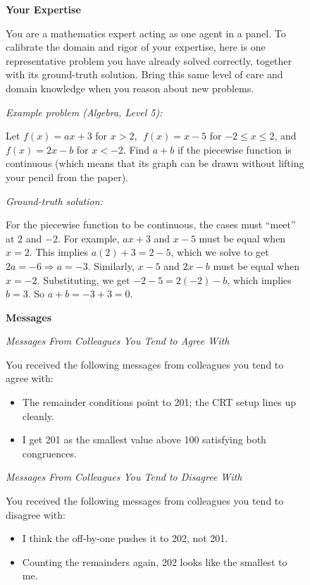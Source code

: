 \begin{figure}[p]
\begin{tcolorbox}[
    title={Objective: Message Prompt},
    colback=gray!5, colframe=gray!60, boxrule=0.5pt, arc=1.5mm,
    left=1.5mm, right=1.5mm, top=0.5mm, bottom=0.5mm
]
\textbf{Your Expertise}\par
You are a mathematics expert acting as one agent in a panel. To calibrate the domain and rigor of your expertise, here is one representative problem you have already solved correctly, together with its ground-truth solution. Bring this same level of care and domain knowledge when you reason about new problems.

\secskip
\textit{Example problem (Algebra, Level 5):}\par
Let $f(x)=ax+3$ for $x>2$, $\;f(x)=x-5$ for $-2\le x\le 2$, and $f(x)=2x-b$ for $x<-2$. Find $a+b$ if the piecewise function is continuous (which means that its graph can be drawn without lifting your pencil from the paper).

\secskip
\textit{Ground-truth solution:}\par
For the piecewise function to be continuous, the cases must ``meet'' at $2$ and $-2$. For example, $ax+3$ and $x-5$ must be equal when $x=2$. This implies $a(2)+3=2-5$, which we solve to get $2a=-6 \Rightarrow a=-3$. Similarly, $x-5$ and $2x-b$ must be equal when $x=-2$. Substituting, we get $-2-5=2(-2)-b$, which implies $b=3$. So $a+b=-3+3=\boxed{0}$.

\secskip
\textbf{Messages}\par
\textit{Messages From Colleagues You Tend to Agree With}\par
You received the following messages from colleagues you tend to agree with:
\begin{itemize}\setlength{\itemsep}{0pt}\setlength{\topsep}{1pt}\setlength{\parsep}{0pt}\setlength{\leftmargin}{1em}
    \item The remainder conditions point to 201; the CRT setup lines up cleanly.
    \item I get 201 as the smallest value above 100 satisfying both congruences.
\end{itemize}
\textit{Messages From Colleagues You Tend to Disagree With}\par
You received the following messages from colleagues you tend to disagree with:
\begin{itemize}\setlength{\itemsep}{0pt}\setlength{\topsep}{1pt}\setlength{\parsep}{0pt}\setlength{\leftmargin}{1em}
    \item I think the off-by-one pushes it to 202, not 201.
    \item Counting the remainders again, 202 looks like the smallest to me.
\end{itemize}


\end{tcolorbox}
\end{figure}
